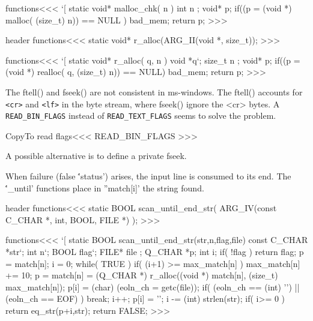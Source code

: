 {{{{{{{\<functions\><<<
`[
static void* malloc_chk( n ) int n
;{      void* p;
   if((p = (void *) malloc( (size_t) n)) == NULL ) bad_mem;
   return p;
}
>>>





\<header functions\><<<
static void* r_alloc(ARG_II(void *, size_t));
>>>

\<functions\><<<
`[
static void* r_alloc( q, n ) 
      void   *q`;
      size_t  n
;{    void*   p;
   if((p = (void *) realloc( q, (size_t) n)) == NULL) bad_mem;
   return p;
}
>>>



 
 
The ftell() and fseek() are not consistent in ms-windows.  The ftell()
accounts for \Verb=<cr>= and \Verb=<lf>= in the byte stream, where
fseek() ignore the <cr> bytes.  A \Verb=READ_BIN_FLAGS= instead of
\Verb=READ_TEXT_FLAGS= seems to solve the problem.

\<CopyTo read flags\><<<
READ_BIN_FLAGS
>>>

A possible alternative is to define a private fseek.


 
% 
% 
% 
% 
% 
% 
% 



When  failure (false \''status') arises, the input line is consumed to
its end. 
The \''_until' functions place in ''match[i]' the string found.

\<header functions\><<<
static BOOL scan_until_end_str( ARG_IV(const C_CHAR *, int, BOOL, FILE *) );
>>>

\<functions\><<<
`[
static BOOL  scan_until_end_str(str,n,flag,file)     
                         const C_CHAR   *str`;
                         int    n`;
                         BOOL   flag`;
                         FILE*  file
;{                       Q_CHAR   *p; 
                         int i;             
   if( !flag ) { return flag; }
   p = match[n];  i = 0;
   while( TRUE ){
     if( (i+1) >= max_match[n] ){
        max_match[n] += 10;
        p = match[n] = (Q_CHAR *)
                     r_alloc((void *) match[n], (size_t) max_match[n]);
     }
     p[i] = (char) (eoln_ch = getc(file));
     if( (eoln_ch == (int) '\n') || (eoln_ch == EOF) ){  break; }
     i++;
   }
   p[i] = '\0';
   i -= (int) strlen(str);
   if( i>= 0 ){  return eq_str(p+i,str);   }
   return FALSE;
}
>>>



}}}}}}}
